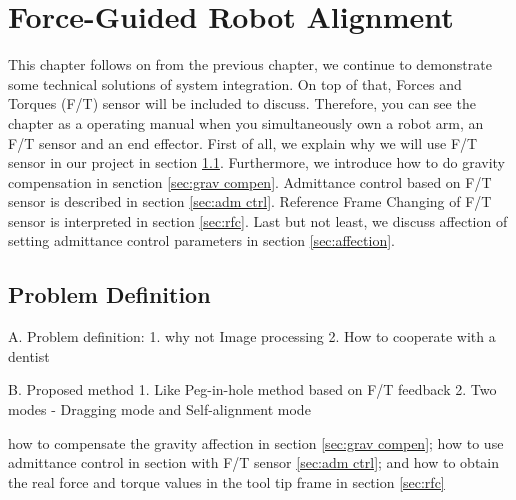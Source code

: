 \chapter{Force-Guided Robot Alignment}
This chapter follows on from the previous chapter, we continue to demonstrate some technical solutions of system integration. On top of that, Forces and Torques (F/T) sensor will be included to discuss. Therefore, you can see the chapter as a operating manual when you simultaneously own a robot arm, an F/T sensor and an end effector. First of all, we explain why we will use F/T sensor in our project in section \ref{sec:pro def}. Furthermore, we introduce how to do gravity compensation in senction \ref{sec:grav compen}. Admittance control based on F/T sensor is described in section \ref{sec:adm ctrl}. Reference Frame Changing of F/T sensor is interpreted in section \ref{sec:rfc}. Last but not least, we discuss affection of setting admittance control parameters in section \ref{sec:affection}.
\section{Problem Definition}
\label{sec:pro def}
A.	Problem definition:
1. why not Image processing				2. How to cooperate with a dentist
\par\noindent
B.	Proposed method
1. Like Peg-in-hole method based on F/T feedback 	2. Two modes - Dragging mode and Self-alignment mode
\par\noindent
how to compensate the gravity affection in section \ref{sec:grav compen}; how to use admittance control in section with F/T sensor \ref{sec:adm ctrl}; and how to obtain the real force and torque values in the tool tip frame in section \ref{sec:rfc}
